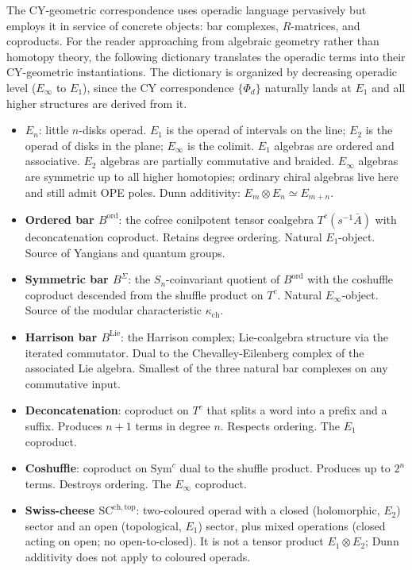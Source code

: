 The CY-geometric correspondence uses operadic language pervasively but employs it in service of concrete objects: bar complexes, $R$-matrices, and coproducts. For the reader approaching from algebraic geometry rather than homotopy theory, the following dictionary translates the operadic terms into their CY-geometric instantiations. The dictionary is organized by decreasing operadic level ($E_\infty$ to $E_1$), since the CY correspondence $\{\Phi_d\}$ naturally lands at $E_1$ and all higher structures are derived from it.

\begin{itemize}
\item \textbf{$E_n$}: little $n$-disks operad. $E_1$ is the operad of intervals on the line; $E_2$ is the operad of disks in the plane; $E_\infty$ is the colimit. $E_1$ algebras are ordered and associative. $E_2$ algebras are partially commutative and braided. $E_\infty$ algebras are symmetric up to all higher homotopies; ordinary chiral algebras live here and still admit OPE poles. Dunn additivity: $E_m \otimes E_n \simeq E_{m+n}$.
\item \textbf{Ordered bar $B^{\mathrm{ord}}$}: the cofree conilpotent tensor coalgebra $T^c(s^{-1}\bar A)$ with deconcatenation coproduct. Retains degree ordering. Natural $E_1$-object. Source of Yangians and quantum groups.
\item \textbf{Symmetric bar $B^{\Sigma}$}: the $S_n$-coinvariant quotient of $B^{\mathrm{ord}}$ with the coshuffle coproduct descended from the shuffle product on $T^c$. Natural $E_\infty$-object. Source of the modular characteristic $\kappa_{\mathrm{ch}}$.
\item \textbf{Harrison bar $B^{\mathrm{Lie}}$}: the Harrison complex; Lie-coalgebra structure via the iterated commutator. Dual to the Chevalley-Eilenberg complex of the associated Lie algebra. Smallest of the three natural bar complexes on any commutative input.
\item \textbf{Deconcatenation}: coproduct on $T^c$ that splits a word into a prefix and a suffix. Produces $n+1$ terms in degree $n$. Respects ordering. The $E_1$ coproduct.
\item \textbf{Coshuffle}: coproduct on $\mathrm{Sym}^c$ dual to the shuffle product. Produces up to $2^n$ terms. Destroys ordering. The $E_\infty$ coproduct.
\item \textbf{Swiss-cheese $\mathrm{SC}^{\mathrm{ch},\mathrm{top}}$}: two-coloured operad with a closed (holomorphic, $E_2$) sector and an open (topological, $E_1$) sector, plus mixed operations (closed acting on open; no open-to-closed). It is not a tensor product $E_1 \otimes E_2$; Dunn additivity does not apply to coloured operads.

\end{itemize}

